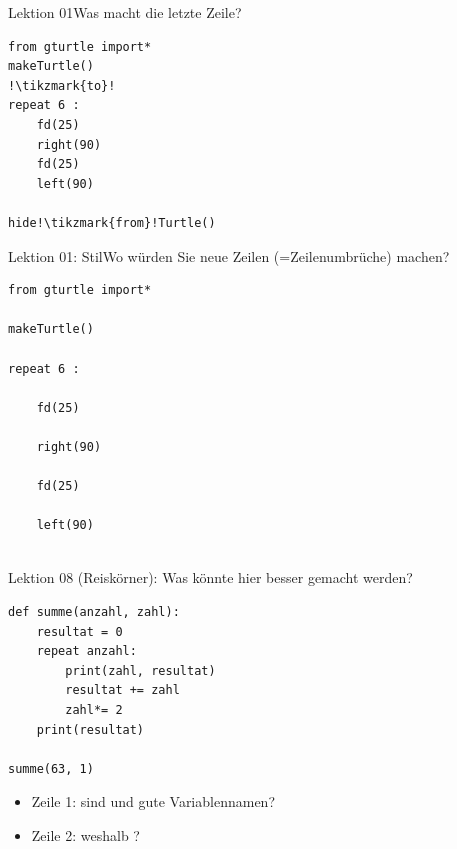 \begin{frame}[fragile]{Lektion 01}{Was macht die letzte Zeile?}
\begin{lstlisting}
from gturtle import*
makeTurtle()
!\tikzmark{to}!
repeat 6 :
    fd(25)
    right(90)
    fd(25)
    left(90)
    
hide!\tikzmark{from}!Turtle()
\end{lstlisting}


\end{frame}

\begin{frame}[fragile]{Lektion 01: Stil}{Wo würden Sie neue Zeilen (=Zeilenumbrüche) machen?}
\begin{lstlisting}
from gturtle import*

makeTurtle()

repeat 6 :

    fd(25)
    
    right(90)
    
    fd(25)
    
    left(90)
    
\end{lstlisting}

\end{frame}



\begin{frame}[fragile]{Lektion 08}
 (Reiskörner): Was könnte hier besser gemacht werden?
\begin{lstlisting}
def summe(anzahl, zahl):
    resultat = 0
    repeat anzahl:
        print(zahl, resultat)
        resultat += zahl
        zahl*= 2
    print(resultat)
    
summe(63, 1)
\end{lstlisting}
\begin{itemize}
    \item Zeile 1: sind  und  gute Variablennamen?
    \item Zeile 2: weshalb ?
\end{itemize}
\end{frame}

